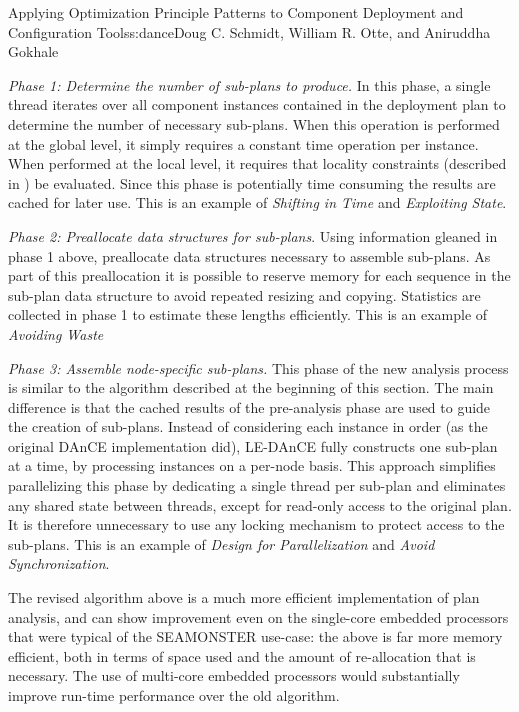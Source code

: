 \begin{aosachapter}{Applying Optimization Principle Patterns to Component Deployment and
                    Configuration Tools}{s:dance}{Doug C. Schmidt, William R. Otte, and Aniruddha Gokhale}
\begin{aosaenumerate}
\def\labelenumi{\arabic{enumi}.}
\item
  \emph{Phase 1: Determine the number of sub-plans to produce.} In this
  phase, a single thread iterates over all component instances contained
  in the deployment plan to determine the number of necessary sub-plans.
  When this operation is performed at the global level, it simply
  requires a constant time operation per instance. When performed at the
  local level, it requires that locality constraints (described in
  ) be evaluated. Since this phase is
  potentially time consuming the results are cached for later use. This
  is an example of \emph{Shifting in Time} and \emph{Exploiting State}.
\item
  \emph{Phase 2: Preallocate data structures for sub-plans}. Using
  information gleaned in phase 1 above, preallocate data structures
  necessary to assemble sub-plans. As part of this preallocation it is
  possible to reserve memory for each sequence in the sub-plan data
  structure to avoid repeated resizing and copying. Statistics are
  collected in phase 1 to estimate these lengths efficiently. This is an
  example of \emph{Avoiding Waste}
\item
  \emph{Phase 3: Assemble node-specific sub-plans.} This phase of the
  new analysis process is similar to the algorithm described at the
  beginning of this section. The main difference is that the cached
  results of the pre-analysis phase are used to guide the creation of
  sub-plans. Instead of considering each instance in order (as the
  original DAnCE implementation did), LE-DAnCE fully constructs one
  sub-plan at a time, by processing instances on a per-node basis. This
  approach simplifies parallelizing this phase by dedicating a single
  thread per sub-plan and eliminates any shared state between threads,
  except for read-only access to the original plan. It is therefore
  unnecessary to use any locking mechanism to protect access to the
  sub-plans. This is an example of \emph{Design for Parallelization} and
  \emph{Avoid Synchronization}.
\end{aosaenumerate}

The revised algorithm above is a much more efficient implementation of
plan analysis, and can show improvement even on the single-core embedded
processors that were typical of the SEAMONSTER use-case: the above is
far more memory efficient, both in terms of space used and the amount of
re-allocation that is necessary. The use of multi-core embedded
processors would substantially improve run-time performance over the old
algorithm.


\end{aosachapter}

